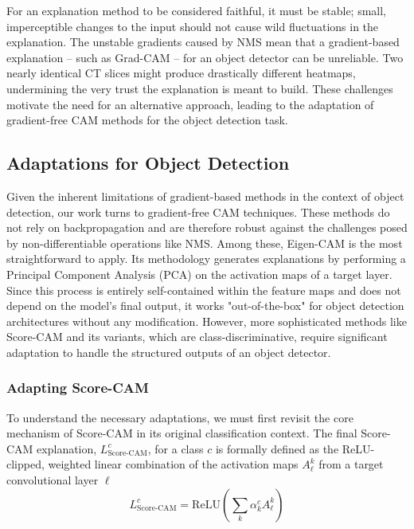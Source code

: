 For an explanation method to be considered faithful, it must be stable; small, imperceptible changes to the input should not cause wild fluctuations in the explanation. The unstable gradients caused by NMS mean that a gradient-based explanation -- such as Grad-CAM -- for an object detector can be unreliable. Two nearly identical CT slices might produce drastically different heatmaps, undermining the very trust the explanation is meant to build. These challenges motivate the need for an alternative approach, leading to the adaptation of gradient-free CAM methods for the object detection task.

\subsection{Adaptations for Object Detection}
Given the inherent limitations of gradient-based methods in the context of object detection, our work turns to gradient-free CAM techniques. These methods do not rely on backpropagation and are therefore robust against the challenges posed by non-differentiable operations like NMS.
Among these, Eigen-CAM is the most straightforward to apply. Its methodology generates explanations by performing a Principal Component Analysis (PCA) on the activation maps of a target layer. Since this process is entirely self-contained within the feature maps and does not depend on the model's final output, it works "out-of-the-box" for object detection architectures without any modification.
However, more sophisticated methods like Score-CAM and its variants, which are class-discriminative, require significant adaptation to handle the structured outputs of an object detector.

\subsubsection{Adapting Score-CAM}

To understand the necessary adaptations, we must first revisit the core mechanism of Score-CAM in its original classification context. The final Score-CAM explanation, $L^{c}_{\text{Score-CAM}}$, for a class $c$ is formally defined as the ReLU-clipped, weighted linear combination of the activation maps $A^{k}_{\ell}$ from a target convolutional layer $\ell$
\begin{equation}
    L^{c}_{\text{Score-CAM}} = \mathrm{ReLU}\left( \sum_{k} \alpha^{c}_{k} A^{k}_{\ell} \right)
    \label{eq:scorecam}
\end{equation}

